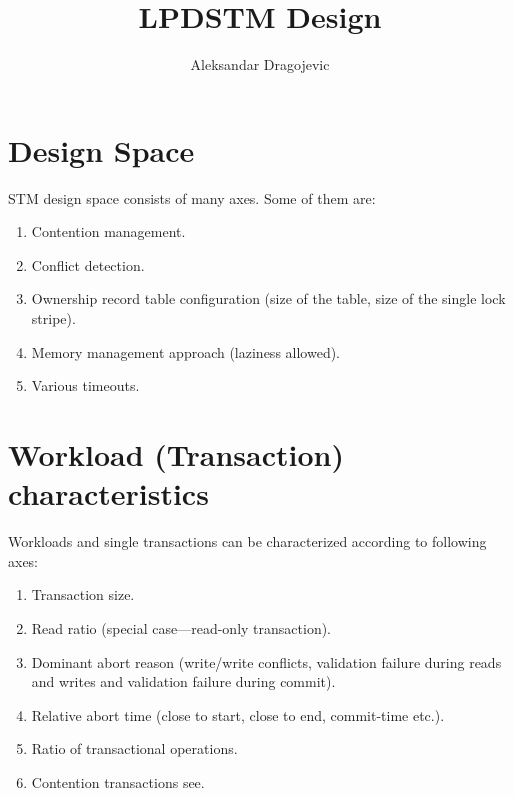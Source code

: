 \documentclass{article}
\begin{document}
\title{LPDSTM Design}
\author{Aleksandar Dragojevic}
\maketitle

\section{Design Space}

STM design space consists of many axes. Some of them are:

\begin{enumerate}
\item Contention management.
\item Conflict detection.
\item Ownership record table configuration (size of the table, size of the single lock
stripe).
\item Memory management approach (laziness allowed).
\item Various timeouts.
\end{enumerate}

\section{Workload (Transaction) characteristics}

Workloads and single transactions can be characterized according to following axes:

\begin{enumerate}
\item Transaction size.
\item Read ratio (special case---read-only transaction).
\item Dominant abort reason (write/write conflicts, validation failure during reads and
writes and validation failure during commit).
\item Relative abort time (close to start, close to end, commit-time etc.).
\item Ratio of transactional operations.
\item Contention transactions see.
\end{enumerate}
\end{document}
